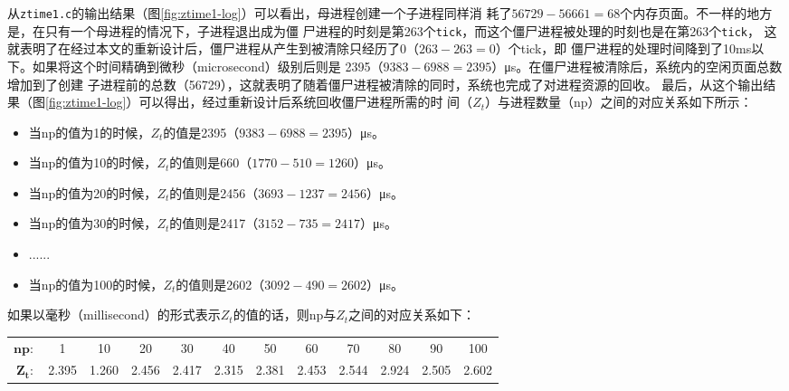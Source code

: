 \documentclass{swfuthesism}
\begin{document}
从\texttt{ztime1.c}的输出结果（图\ref{fig:ztime1-log}）可以看出，母进程创建一个子进程同样消
耗了$56729-56661=68$个内存页面。不一样的地方是，在只有一个母进程的情况下，子进程退出成为僵
尸进程的时刻是第263个\texttt{tick}，而这个僵尸进程被处理的时刻也是在第263个\texttt{tick}，
这就表明了在经过本文的重新设计后，僵尸进程从产生到被清除只经历了0（$263-263=0$）个tick，即
僵尸进程的处理时间降到了10ms以下。如果将这个时间精确到微秒（microsecond）级别后则是
2395（$9383-6988=2395$）μs。在僵尸进程被清除后，系统内的空闲页面总数增加到了创建
子进程前的总数（56729），这就表明了随着僵尸进程被清除的同时，系统也完成了对进程资源的回收。
最后，从这个输出结果（图\ref{fig:ztime1-log}）可以得出，经过重新设计后系统回收僵尸进程所需的时
间（$Z_t$）与进程数量（np）之间的对应关系如下所示：
\begin{itemize}
\item 当np的值为1的时候，$Z_t$的值是2395（$9383-6988=2395$）μs。
\item 当np的值为10的时候，$Z_t$的值则是660（$1770-510=1260$）μs。
\item 当np的值为20的时候，$Z_t$的值则是2456（$3693-1237=2456$）μs。
\item 当np的值为30的时候，$Z_t$的值则是2417（$3152-735=2417$）μs。
\item ......
\item 当np的值为100的时候，$Z_t$的值则是2602（$3092-490=2602$）μs。
\end{itemize}
如果以毫秒（millisecond）的形式表示$Z_t$的值的话，则np与$Z_t$之间的对应关系如下：
\begin{center}{\footnotesize
  \begin{tabular}{rccccccccccc}
    $\mathbf{np:}$&1&10&20&30&40&50&60&70&80&90&100\\[-3ex]
    $\mathbf{Z_t}:$&2.395& 1.260& 2.456& 2.417&  2.315& 2.381& 2.453& 2.544& 2.924& 2.505& 2.602
  \end{tabular}}
\end{center}


\begin{figure}
  \centering
  \label{fig:ztime-log}
\end{figure}
\end{document}
